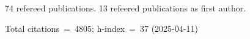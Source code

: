 74 refereed publications. 13 refeered publications as first author.

Total citations~=~4805; h-index~=~37 (2025-04-11)